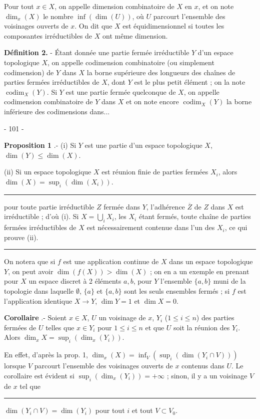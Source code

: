 Pour tout $x \in X$, on appelle dimension combinatoire de $X$ en $x$, et on note $\dim_x(X)$ le nombre $\inf(\dim(U))$, où $U$ parcourt l'ensemble des voisinages ouverts de $x$. On dit que $X$ est équidimensionnel si toutes les composantes irréductibles de $X$ ont même dimension.

\textbf{Définition 2.} - Étant donnée une partie fermée irréductible $Y$ d'un espace topologique $X$, on appelle codimension combinatoire (ou simplement codimension) de $Y$ dans $X$ la borne supérieure des longueurs des chaînes de parties fermées irréductibles de $X$, dont $Y$ est le plus petit élément ; on la note $\operatorname{codim}_X(Y)$. Si $Y$ est une partie fermée quelconque de $X$, on appelle codimension combinatoire de $Y$ dans $X$ et on note encore $\operatorname{codim}_X(Y)$ la borne inférieure des codimensions dans...

\newpage


- 101 -

\noindent \textbf{Proposition 1} .- (i) Si $Y$ est une partie d'un espace topologique $X$, $\dim(Y) \leqslant \dim(X)$.

\noindent (ii) Si un espace topologique $X$ est réunion finie de parties fermées $X_i$, alors $\dim(X) = \sup_i (\dim(X_i))$.

\noindent \rule{\linewidth}{0.4pt}
\noindent pour toute partie irréductible $Z$ fermée dans $Y$, l'adhérence $\overline{Z}$ de $Z$ dans $X$ est irréductible ; d'où (i). Si $X = \bigcup_i X_i$, les $X_i$ étant fermés, toute chaîne de parties fermées irréductibles de $X$ est nécessairement contenue dans l'un des $X_i$, ce qui prouve (ii). \rule{\linewidth}{0.4pt} On notera que si $f$ est une application continue de $X$ dans un espace topologique $Y$, on peut avoir $\dim(f(X)) > \dim(X)$ ; on en a un exemple en prenant pour $X$ un espace discret à 2 éléments $a, b$, pour $Y$ l'ensemble $\{a, b\}$ muni de la topologie dans laquelle $\emptyset$, $\{a\}$ et $\{a, b\}$ sont les seuls ensembles fermés ; si $f$ est l'application identique $X \to Y$, $\dim Y = 1$ et $\dim X = 0$.

\noindent \textbf{Corollaire} .- Soient $x \in X$, $U$ un voisinage de $x$, $Y_i$ ($1 \leqslant i \leqslant n$) des parties fermées de $U$ telles que $x \in Y_i$ pour $1 \leqslant i \leqslant n$ et que $U$ soit la réunion des $Y_i$. Alors $\dim_x X = \sup_i (\dim_x(Y_i))$.

\noindent En effet, d'après la prop. 1, $\dim_x(X) = \inf_V (\sup_i(\dim(Y_i \cap V)))$ lorsque $V$ parcourt l'ensemble des voisinages ouverts de $x$ contenus dans $U$. Le corollaire est évident si $\sup_i (\dim_x(Y_i)) = +\infty$ ; sinon, il y a un voisinage $V$ de $x$ tel que \rule{1.5cm}{0.4pt} $\dim(Y_i \cap V) = \dim(Y_i)$ pour tout $i$ et tout $V \subset V_0$.

